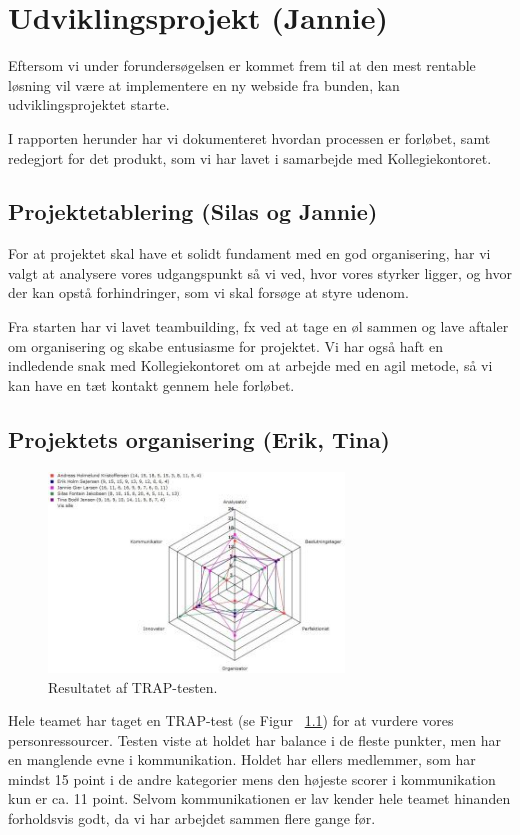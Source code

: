 \documentclass[12pt, a4paper]{report}
\begin{document}
\chapter{Udviklingsprojekt (Jannie)}

Eftersom vi under forundersøgelsen er kommet frem til at den mest rentable løsning vil være at implementere en ny webside fra bunden, kan udviklingsprojektet starte.

I rapporten herunder har vi dokumenteret hvordan processen er forløbet, samt redegjort for det produkt, som vi har lavet i samarbejde med Kollegiekontoret.

\section{Projektetablering (Silas og Jannie)}

For at projektet skal have et solidt fundament med en god organisering, har vi valgt at analysere vores udgangspunkt så vi ved, hvor vores styrker ligger, og hvor der kan opstå forhindringer, som vi skal forsøge at styre udenom.

Fra starten har vi lavet teambuilding, fx ved at tage en øl sammen og lave aftaler om organisering og skabe entusiasme for projektet. Vi har også haft en indledende snak med Kollegiekontoret om at arbejde med en agil metode, så vi kan have en tæt kontakt gennem hele forløbet.

\section{Projektets organisering (Erik, Tina)}
\begin{figure}[ht!]
\centering
\includegraphics[width=0.7\textwidth]{itsaTRAP}
\caption{Resultatet af TRAP-testen.}
\label{trap}
\end{figure}

Hele teamet har taget en TRAP-test (se Figur ~\ref{trap}) for at vurdere vores personressourcer. Testen viste at holdet har balance i de fleste punkter, men har en manglende evne i kommunikation. Holdet har ellers medlemmer, som har mindst 15 point i de andre kategorier mens den højeste scorer i kommunikation kun er ca. 11 point. Selvom kommunikationen er lav kender hele teamet hinanden forholdsvis godt, da vi har arbejdet sammen flere gange før.
\end{document}
